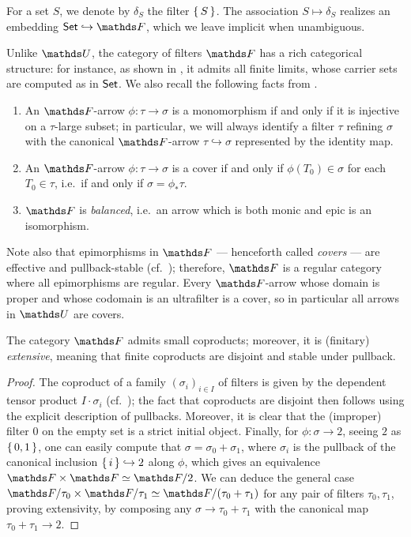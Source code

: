 \begin{nota}\label{nota:def-deltaS}
    For a set $S$, we denote by $\delta_S$ the filter $\set{S}$. The association $S \mapsto \delta_S$ realizes an embedding $\Set \hookrightarrow \FF$, which we leave implicit when unambiguous.
\end{nota}


Unlike $\UF$, the category of filters $\FF$ has a rich categorical structure: for instance, as shown in \cite[Thm.\ 9]{blassTwoClosedCategories1977}, it admits all finite limits, whose carrier sets are computed as in $\mathsf{Set}$. We also recall the following facts from \cite[Thm.\ 6]{blassTwoClosedCategories1977}.
\begin{enumerate}
    \item{} An $\FF$-arrow $\phi \colon \tau \to \sigma$ is a monomorphism if and only if it is injective on a $\tau$-large subset; in particular, we will always identify a filter $\tau$ refining $\sigma$ with the canonical $\FF$-arrow $\tau \hookrightarrow \sigma$ represented by the identity map.
    \item  An $\FF$-arrow $\phi \colon \tau \to \sigma$ is a cover if and only if $\phi(T_0) \in \sigma$ for each $T_0 \in \tau$, i.e.\ if and only if $\sigma = \phi_*\tau$. 
    \item $\FF$ is \emph{balanced}, i.e.\ an arrow which is both monic and epic is an isomorphism.
\end{enumerate}

Note also that epimorphisms in $\FF$ --- henceforth called \emph{covers} --- are effective and pullback-stable (cf.\ \cite[Lem.\ 1.2]{moerdijkModelIntuitionisticNonstandard1995}); therefore, $\FF$ is a regular category where all epimorphisms are regular. Every $\FF$-arrow whose domain is proper and whose codomain is an ultrafilter is a cover, so in particular all arrows in $\UF$ are covers.

\begin{prop}\label{prop:F-is-lextensive}
    The category $\FF$ admits small coproducts; moreover, it is (finitary) \emph{extensive}, meaning that finite coproducts are disjoint and stable under pullback.
\begin{proof}
    The coproduct of a family $(\sigma_i)_{i\in I}$ of filters is given by the dependent tensor product $I \cdot \sigma_i$ (cf.\ ); the fact that coproducts are disjoint then follows using the explicit description of pullbacks. Moreover, it is clear that the (improper) filter $0$ on the empty set is a strict initial object. Finally, for $\phi\colon \sigma\to 2$, seeing $2$ as $\set{0,1}$, one can easily compute that $\sigma = \sigma_0+\sigma_1$, where $\sigma_i$ is the pullback of the canonical inclusion $\set{i}\hookrightarrow2$ along $\phi$, which gives an equivalence $\FF \times \FF \simeq \FF/2$. We can deduce the general case $\FF/\tau_0 \times \FF/\tau_1 \simeq \FF/(\tau_0+\tau_1)$ for any pair of filters $\tau_0,\tau_1$, proving extensivity, by composing any $\sigma\to \tau_0+\tau_1$ with the canonical map $\tau_0+\tau_1\to2$. 
\end{proof}
\end{prop}

